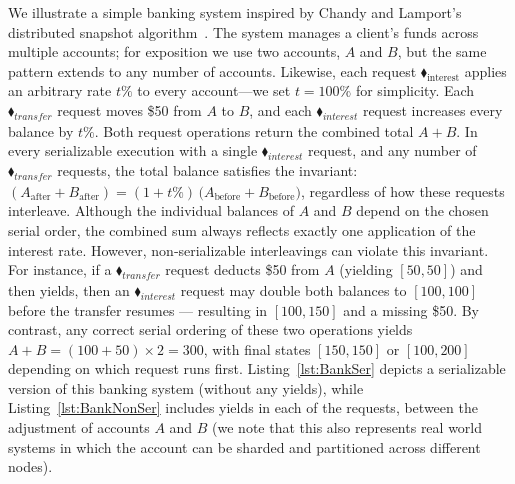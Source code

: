 We illustrate a simple banking system inspired by Chandy and Lamport’s distributed snapshot algorithm~\cite{ChLa85}.  The system manages a client’s funds across multiple accounts; for exposition we use two accounts, \(A\) and \(B\), but the same pattern extends to any number of accounts.  Likewise, each request {\color{ForestGreen}$\blacklozenge_\text{interest}$} applies an arbitrary rate \(t\%\) to every account—we set \(t=100\%\) for simplicity.
%
Each {\color{ForestGreen}$\blacklozenge_{\mathit{transfer}}$} request moves \$50 from \(A\) to \(B\), and each {\color{ForestGreen}$\blacklozenge_{\mathit{interest}}$} request increases every balance by \(t\%\).  Both request operations return the combined total \(A + B\).
%
In every serializable execution with a single {\color{ForestGreen}$\blacklozenge_{\mathit{interest}}$} request, and any number of {\color{ForestGreen}$\blacklozenge_{\mathit{transfer}}$} requests, the total balance satisfies the invariant:
$
(A_{\text{after}} + B_{\text{after}})
= (1 + t\%) \,\bigl(A_{\text{before}} + B_{\text{before}}\bigr)
$,
%
%
regardless of how these requests interleave.  Although the individual balances of \(A\) and \(B\) depend on the chosen serial order, the combined sum always reflects exactly one application of the interest rate.
%
However, non‐serializable interleavings can violate this invariant.  For instance, if a {\color{ForestGreen}$\blacklozenge_{\mathit{transfer}}$} request deducts \$50 from \(A\) (yielding \([50,50]\)) and then yields, then an {\color{ForestGreen}$\blacklozenge_{\mathit{interest}}$} request may double both balances to \([100,100]\) before the transfer resumes --- resulting in \([100,150]\) and a missing \$50.  By contrast, any correct serial ordering of these two operations yields \(A + B = (100+50)\times2 = 300\), with final states \([150,150]\) or \([100,200]\) depending on which request runs first.
%
%
Listing~\ref{lst:BankSer} depicts a serializable version of this banking system (without any yields), while Listing~\ref{lst:BankNonSer} includes yields in each of the requests, between the adjustment of accounts $A$ and $B$ (we note that this also represents real world systems in which the account can be sharded and partitioned across different nodes).
%


